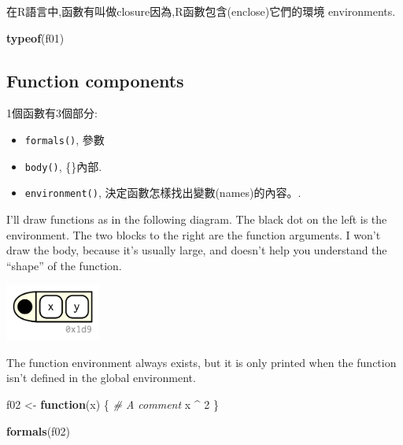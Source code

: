 \documentclass[]{book}
\newenvironment{Shaded}{\begin{snugshade}}{\end{snugshade}}
\newcommand{\CommentTok}[1]{\textcolor[rgb]{0.56,0.35,0.01}{\textit{#1}}}
\newcommand{\ControlFlowTok}[1]{\textcolor[rgb]{0.13,0.29,0.53}{\textbf{#1}}}
\newcommand{\DecValTok}[1]{\textcolor[rgb]{0.00,0.00,0.81}{#1}}
\newcommand{\KeywordTok}[1]{\textcolor[rgb]{0.13,0.29,0.53}{\textbf{#1}}}
\newcommand{\NormalTok}[1]{#1}
\newcommand{\OperatorTok}[1]{\textcolor[rgb]{0.81,0.36,0.00}{\textbf{#1}}}
\newcommand{\StringTok}[1]{\textcolor[rgb]{0.31,0.60,0.02}{#1}}
\theoremstyle{definition}
\theoremstyle{definition}
\theoremstyle{definition}
\theoremstyle{remark}
\begin{document}
在R語言中,函數有叫做closure因為,R函數包含(enclose)它們的環境
environments.

\begin{Shaded}
\begin{Highlighting}[]
\KeywordTok{typeof}\NormalTok{(f01)}
\end{Highlighting}
\end{Shaded}

\hypertarget{function-components}{%
\subsection{Function components}\label{function-components}}

1個函數有3個部分:

\begin{itemize}
\item
  \texttt{formals()}, 參數
\item
  \texttt{body()}, \{\}內部.
\item
  \texttt{environment()}, 決定函數怎樣找出變數(names)的內容。.
\end{itemize}

I'll draw functions as in the following diagram. The black dot on the
left is the environment. The two blocks to the right are the function
arguments. I won't draw the body, because it's usually large, and
doesn't help you understand the ``shape'' of the function.

\begin{center}\includegraphics[width=1.23in]{diagrams/functions/components} \end{center}

The function environment always exists, but it is only printed when the
function isn't defined in the global environment.

\begin{Shaded}
\begin{Highlighting}[]
\NormalTok{f02 <-}\StringTok{ }\ControlFlowTok{function}\NormalTok{(x) \{}
  \CommentTok{# A comment}
\NormalTok{  x }\OperatorTok{^}\StringTok{ }\DecValTok{2}
\NormalTok{\}}

\KeywordTok{formals}\NormalTok{(f02)}
\end{Highlighting}
\end{Shaded}
\end{document}
